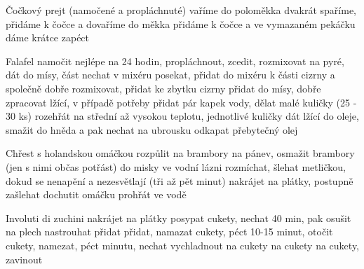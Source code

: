\documentclass[12pt,a4paper]{article}
\begin{document}
\begin{recipe}{Čočkový prejt}
   (namočené a propláchnuté)
   vaříme do poloměkka
   dvakrát spaříme, přidáme k čočce a dovaříme do měkka
   přidáme k čočce a ve vymazaném pekáčku dáme krátce zapéct
\end{recipe}
\newpage

\begin{recipe}{Falafel}
   namočit nejlépe na 24 hodin, propláchnout, zcedit, rozmixovat na pyré, dát do mísy, část nechat v mixéru
   posekat, přidat do mixéru k části cizrny a společně dobře rozmixovat, přidat ke zbytku cizrny
   přidat do mísy, dobře zpracovat lžící, v případě potřeby přidat pár kapek vody, dělat malé kuličky  (25 - 30 ks)
   rozehřát na střední až vysokou teplotu, jednotlivé kuličky dát lžící do oleje, smažit do hněda a pak nechat na ubrousku odkapat přebytečný olej
\end{recipe}
\newpage

\begin{recipe}{Chřest s holandskou omáčkou}
   rozpůlit
   na brambory
   na pánev, osmažit brambory (jen s nimi občas potřást)
   do misky ve vodní lázni
   rozmíchat, šlehat metličkou, dokud se nenapění a nezesvětlají (tři až pět minut)
   nakrájet na plátky, postupně zašlehat
   dochutit omáčku
   prohřát ve vodě
\end{recipe}
\newpage

\begin{recipe}{Involuti di zuchini}
   nakrájet na plátky
   posypat cukety, nechat 40 min, pak osušit
   na plech
   nastrouhat
   přidat
   přidat, namazat cukety, péct 10-15 minut, otočit cukety, namezat, péct minutu, nechat vychladnout
   na cukety
   na cukety
   na cukety, zavinout
\end{recipe}
\newpage
\end{document}
